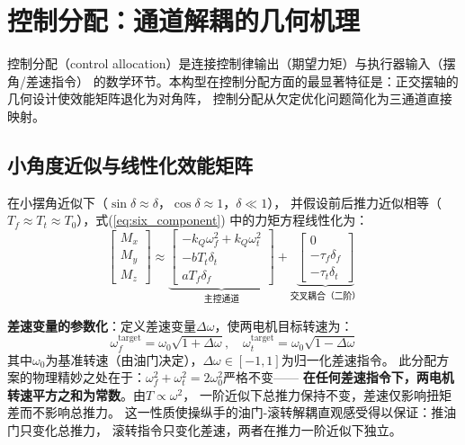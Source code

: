 \documentclass[a4paper,12pt]{ctexart}
\theoremstyle{plain}
\theoremstyle{definition}
\begin{document}
\section{控制分配：通道解耦的几何机理}
\label{sec:allocation}

控制分配（control allocation）是连接控制律输出（期望力矩）与执行器输入（摆角/差速指令）
的数学环节。本构型在控制分配方面的最显著特征是：正交摆轴的几何设计使效能矩阵退化为对角阵，
控制分配从欠定优化问题简化为三通道直接映射。

\subsection{小角度近似与线性化效能矩阵}

在小摆角近似下（$\sin\delta \approx \delta$，$\cos\delta \approx 1$，$\delta \ll 1$），
并假设前后推力近似相等（$T_f \approx T_t \approx T_0$），式(\ref{eq:six_component})
中的力矩方程线性化为：
\begin{equation}
    \begin{bmatrix} M_x \\ M_y \\ M_z \end{bmatrix}
    \approx
    \underbrace{
    \begin{bmatrix}
        -k_Q \omega_f^2 + k_Q \omega_t^2 \\
        -b T_t \delta_t \\
        a T_f \delta_f
    \end{bmatrix}
    }_{\text{主控通道}}
    +
    \underbrace{
    \begin{bmatrix}
        0 \\
        -\tau_f \delta_f \\
        -\tau_t \delta_t
    \end{bmatrix}
    }_{\text{交叉耦合（二阶）}}
    \label{eq:moment_linearized}
\end{equation}

\textbf{差速变量的参数化}：定义差速变量$\Delta\omega$，使两电机目标转速为：
\begin{equation}
    \omega_f^{\text{target}} = \omega_0 \sqrt{1 + \Delta\omega}, \quad
    \omega_t^{\text{target}} = \omega_0 \sqrt{1 - \Delta\omega}
    \label{eq:diff_def}
\end{equation}
其中$\omega_0$为基准转速（由油门决定），$\Delta\omega \in [-1, 1]$为归一化差速指令。
此分配方案的物理精妙之处在于：$\omega_f^2 + \omega_t^2 = 2\omega_0^2$严格不变——
\textbf{在任何差速指令下，两电机转速平方之和为常数}。由$T \propto \omega^2$，
一阶近似下总推力保持不变，差速仅影响扭矩差而不影响总推力。
这一性质使操纵手的油门-滚转解耦直观感受得以保证：推油门只变化总推力，
滚转指令只变化差速，两者在推力一阶近似下独立。
\end{document}
